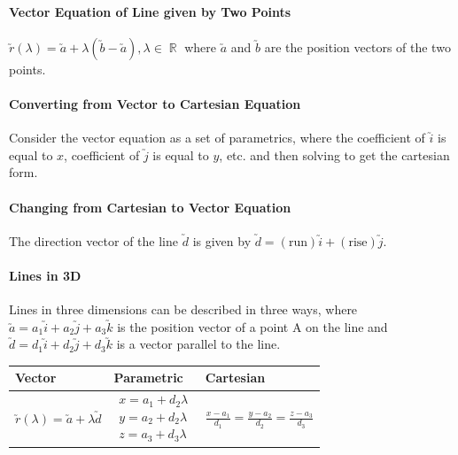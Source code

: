 \documentclass[a4paper,twoside,10pt]{article}
\DeclareMathOperator\R{\mathbb{R}}
\begin{document}
			\paragraph{Vector Equation of Line given by Two Points} $\utilde{r}(\lambda)=\utilde{a}+\lambda\left(\utilde{b}-\utilde{a}\right),\lambda\in\R$ where $\utilde{a}$ and $\utilde{b}$ are the position vectors of the two points.
			
			\paragraph{Converting from Vector to Cartesian Equation} Consider the vector equation as a set of parametrics, where the coefficient of $\utilde{i}$ is equal to $x$, coefficient of $\utilde{j}$ is equal to $y$, etc. and then solving to get the cartesian form.
			
			\paragraph{Changing from Cartesian to Vector Equation} The direction vector of the line $\utilde{d}$ is given by $\utilde{d}=\mathrm{(run)}\utilde{i}+\mathrm{(rise)}\utilde{j}$.
			
			\paragraph{Lines in 3D} Lines in three dimensions can be described in three ways, where $\utilde{a}=a_1\utilde{i}+a_2\utilde{j}+a_3\utilde{k}$ is the position vector of a point A on the line and $\utilde{d}=d_1\utilde{i}+d_2\utilde{j}+d_3\utilde{k}$ is a vector parallel to the line.
			\begin{center}
				\bgroup
				\def\arraystretch{2}
				\begin{tabularx}{\textwidth}{|m{3cm}*2{|X}|}
					\hline
					\centering Vector & Parametric & Cartesian \\
					\hline
					\vspace{2em}
					\centering$\utilde{r}(\lambda)=\utilde{a}+\lambda\utilde{d}$ & $\begin{aligned}
						x=a_1+d_2\lambda \\[1em]
						y=a_2+d_2\lambda \\[1em]
						z=a_3+d_3\lambda
					\end{aligned}$ & \(\frac{x-a_1}{d_1}=\frac{y-a_2}{d_2}=\frac{z-a_3}{d_3}\) \\
					\hline
				\end{tabularx}
				\egroup
			\end{center}
			
\end{document}
